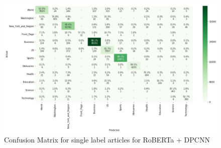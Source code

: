 \documentclass{article}
\begin{document}
\begin{figure}[!htb]
    \centering
    \includegraphics[scale=0.4]{images/confusion_roberta_dpcnn.png}
    \caption{Confusion Matrix for single label articles for RoBERTa + DPCNN}
    \label{fig:confusion_roberta_dpcnn}
\end{figure}
\end{document}
